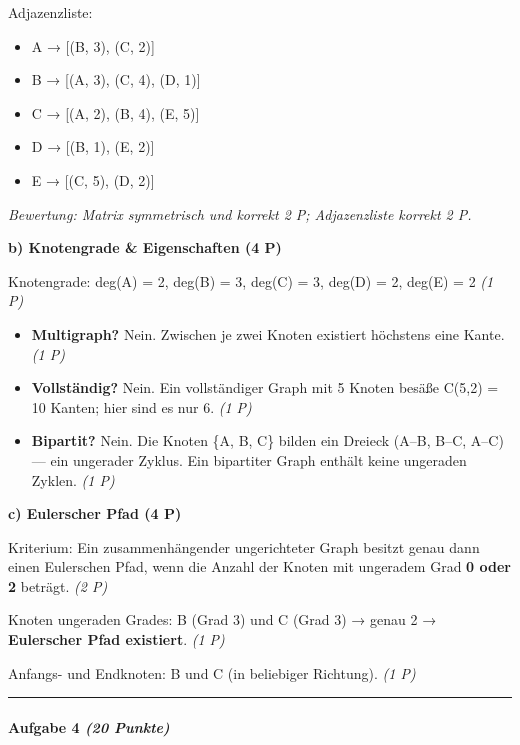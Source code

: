 \documentclass[11pt, a4paper]{article}
\begin{document}
Adjazenzliste:

\begin{itemize}
  \item A → [(B, 3), (C, 2)]
  \item B → [(A, 3), (C, 4), (D, 1)]
  \item C → [(A, 2), (B, 4), (E, 5)]
  \item D → [(B, 1), (E, 2)]
  \item E → [(C, 5), (D, 2)]
\end{itemize}

\textit{Bewertung: Matrix symmetrisch und korrekt 2 P; Adjazenzliste korrekt 2 P.}


\textbf{b) Knotengrade \& Eigenschaften (4 P)}


Knotengrade: deg(A) = 2, deg(B) = 3, deg(C) = 3, deg(D) = 2, deg(E) = 2 \textit{(1 P)}


\begin{itemize}
  \item \textbf{Multigraph?} Nein. Zwischen je zwei Knoten existiert höchstens eine Kante. \textit{(1 P)}
  \item \textbf{Vollständig?} Nein. Ein vollständiger Graph mit 5 Knoten besäße C(5,2) = 10 Kanten; hier sind es nur 6. \textit{(1 P)}
  \item \textbf{Bipartit?} Nein. Die Knoten \{A, B, C\} bilden ein Dreieck (A–B, B–C, A–C) — ein ungerader Zyklus. Ein bipartiter Graph enthält keine ungeraden Zyklen. \textit{(1 P)}
\end{itemize}

\textbf{c) Eulerscher Pfad (4 P)}


Kriterium: Ein zusammenhängender ungerichteter Graph besitzt genau dann einen Eulerschen Pfad, wenn die Anzahl der Knoten mit ungeradem Grad \textbf{0 oder 2} beträgt. \textit{(2 P)}


Knoten ungeraden Grades: B (Grad 3) und C (Grad 3) → genau 2 → \textbf{Eulerscher Pfad existiert}. \textit{(1 P)}


Anfangs- und Endknoten: B und C (in beliebiger Richtung). \textit{(1 P)}



\noindent\textcolor{rulegray}{\rule{\linewidth}{0.4pt}}


\paragraph{Aufgabe 4 \textit{(20 Punkte)}}\mbox{}\\[2pt]
\end{document}
